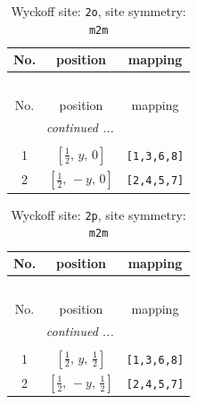 \documentclass[fleqn,8pt]{jsarticle}
\begin{document}
\renewcommand{\arraystretch}{1.2}
\begin{longtable}{ccc}
\caption{Wyckoff site: {\tt 2o}, site symmetry: {\tt m2m}}
 \\
 \hline \hline
No. & position & mapping \\ \hline \endfirsthead

\multicolumn{2}{l}{\tablename\ \thetable{}} \\
 \hline \hline
No. & position & mapping \\ \hline \endhead

 \hline \hline
\multicolumn{2}{r}{\footnotesize\it continued ...} \\ \endfoot

 \hline \hline
\multicolumn{2}{r}{} \\ \endlastfoot

1 & $\left[ \frac{1}{2},\, y,\, 0 \right]$ & {\tt [1,3,6,8]} \\ \hline
2 & $\left[ \frac{1}{2},\, - y,\, 0 \right]$ & {\tt [2,4,5,7]} \\
\end{longtable}
\renewcommand{\arraystretch}{1.2}
\begin{longtable}{ccc}
\caption{Wyckoff site: {\tt 2p}, site symmetry: {\tt m2m}}
 \\
 \hline \hline
No. & position & mapping \\ \hline \endfirsthead

\multicolumn{2}{l}{\tablename\ \thetable{}} \\
 \hline \hline
No. & position & mapping \\ \hline \endhead

 \hline \hline
\multicolumn{2}{r}{\footnotesize\it continued ...} \\ \endfoot

 \hline \hline
\multicolumn{2}{r}{} \\ \endlastfoot

1 & $\left[ \frac{1}{2},\, y,\, \frac{1}{2} \right]$ & {\tt [1,3,6,8]} \\ \hline
2 & $\left[ \frac{1}{2},\, - y,\, \frac{1}{2} \right]$ & {\tt [2,4,5,7]} \\
\end{longtable}
\renewcommand{\arraystretch}{1.2}
\end{document}
